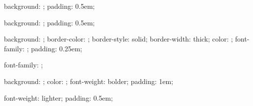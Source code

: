 %
{%
  background: \@getcolor{\subsectionbackgroundcolor};
  padding: 0.5em;
}


%
{%
  background: \@getcolor{\subsubsectionbackgroundcolor};
  padding: 0.5em;
}


%
{%
  background: \@getcolor{\terminalbackgroundcolor};
  border-color: \@getcolor{\terminalbordercolor};
  border-style: solid;
  border-width: thick;
  color: \@getcolor{\terminalcolor};
  font-family: \fixedfontfamily;
  padding: 0.25em;
}


{
  font-family: \sansfontfamily;
}


%
{%
  background: \@getcolor{\titlebackgroundcolor};
  color: \@getcolor{\titleforegroundcolor};
  font-weight: bolder;
  padding: 1em;
}


%
{%
  font-weight: lighter;
  padding: 0.5em;
}


